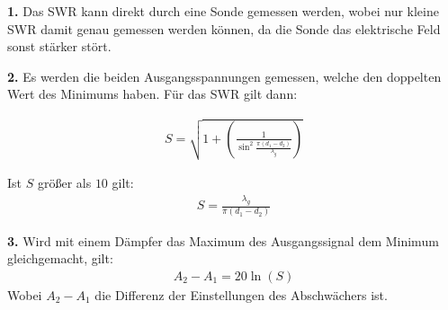 \textbf{1.} Das SWR kann direkt durch eine Sonde gemessen werden, wobei nur kleine SWR
damit genau gemessen werden können, da die Sonde das elektrische Feld sonst stärker
stört.

\textbf{2.} Es werden die beiden Ausgangsspannungen gemessen, welche den doppelten Wert
des Minimums haben. Für das SWR gilt dann:

\begin{align}
  S = \sqrt{1+  \left(\frac{1}{\sin^2{ \frac{\pi(d_1 - d_2)}{\lambda_g} }} \right) }
\end{align}

Ist $S$ größer als $10$ gilt:
\begin{align}
  S = \frac{\lambda_g}{\pi(d_1-d_2)}
\end{align}

\textbf{3.} Wird mit einem Dämpfer das Maximum des Ausgangssignal dem Minimum gleichgemacht, gilt:
\begin{align}
  A_2 - A_1 = 20 \ln(S)
\end{align}
Wobei $A_2 - A_1$ die Differenz der Einstellungen des Abschwächers ist.
